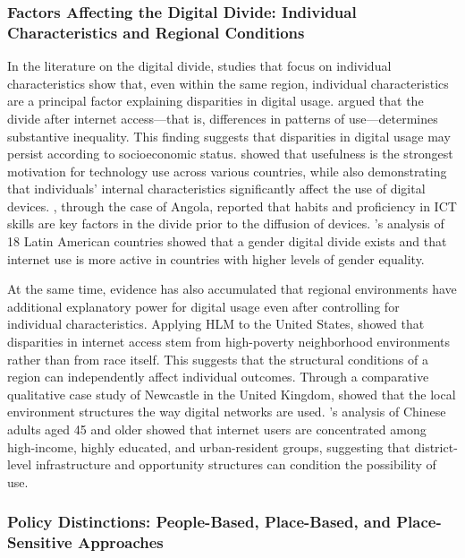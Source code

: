 \subsubsection{Factors Affecting the Digital Divide: Individual Characteristics and Regional Conditions}
\label{subsubsec:2-1-1}

In the literature on the digital divide, studies that focus on individual characteristics show that, even within the same region, individual characteristics are a principal factor explaining disparities in digital usage. \citet{Hargittai2010} argued that the divide after internet access---that is, differences in patterns of use---determines substantive inequality. This finding suggests that disparities in digital usage may persist according to socioeconomic status. \citet{ChipevaEtAl2018} showed that usefulness is the strongest motivation for technology use across various countries, while also demonstrating that individuals' internal characteristics significantly affect the use of digital devices. \citet{BorgesEtAl2020}, through the case of Angola, reported that habits and proficiency in ICT skills are key factors in the divide prior to the diffusion of devices. \citet{Hilbert2011}'s analysis of 18 Latin American countries showed that a gender digital divide exists and that internet use is more active in countries with higher levels of gender equality.

At the same time, evidence has also accumulated that regional environments have additional explanatory power for digital usage even after controlling for individual characteristics. Applying HLM to the United States, \citet{MossbergerEtAl2006} showed that disparities in internet access stem from high-poverty neighborhood environments rather than from race itself. This suggests that the structural conditions of a region can independently affect individual outcomes. Through a comparative qualitative case study of Newcastle in the United Kingdom, \citet{CrangEtAl2006} showed that the local environment structures the way digital networks are used. \citet{HongEtAl2017}'s analysis of Chinese adults aged 45 and older showed that internet users are concentrated among high-income, highly educated, and urban-resident groups, suggesting that district-level infrastructure and opportunity structures can condition the possibility of use.

\subsubsection{Policy Distinctions: People-Based, Place-Based, and Place-Sensitive Approaches}
\label{subsubsec:2-1-2}

